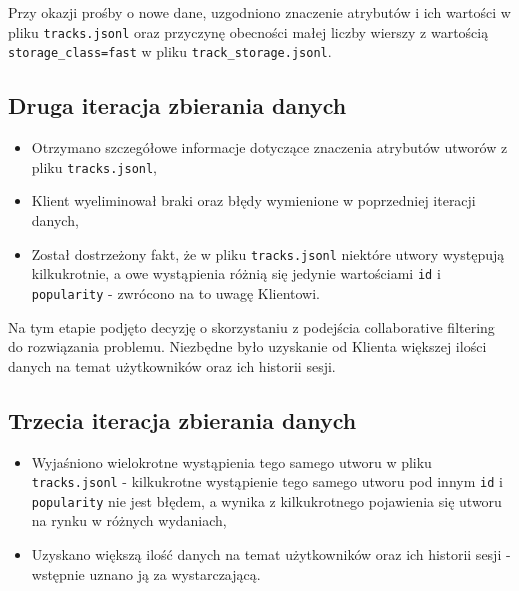 \documentclass[10pt,a4paper]{article}
\begin{document}
Przy okazji prośby o nowe dane, uzgodniono znaczenie atrybutów i ich wartości w pliku \texttt{tracks.jsonl} oraz przyczynę obecności małej liczby wierszy z wartością \texttt{storage\_class=fast} w pliku \texttt{track\_storage.jsonl}.

\subsection{Druga iteracja zbierania danych}
\begin{itemize}
\item Otrzymano szczegółowe informacje dotyczące znaczenia atrybutów utworów z pliku \texttt{tracks.jsonl},
\item Klient wyeliminował braki oraz błędy wymienione w poprzedniej iteracji danych,
\item Został dostrzeżony fakt, że w pliku \texttt{tracks.jsonl} niektóre utwory występują kilkukrotnie, a owe wystąpienia różnią się jedynie wartościami \texttt{id} i \texttt{popularity} - zwrócono na to uwagę Klientowi.

\end{itemize}

Na tym etapie podjęto decyzję o skorzystaniu z podejścia collaborative filtering do rozwiązania problemu. Niezbędne było uzyskanie od Klienta większej ilości danych na temat użytkowników oraz ich historii sesji.

\subsection{Trzecia iteracja zbierania danych}
\begin{itemize}
\item Wyjaśniono wielokrotne wystąpienia tego samego utworu w pliku \texttt{tracks.jsonl} - kilkukrotne wystąpienie tego samego utworu pod innym \texttt{id} i \texttt{popularity} nie jest błędem, a wynika z kilkukrotnego pojawienia się utworu na rynku w różnych wydaniach,
\item Uzyskano większą ilość danych na temat użytkowników oraz ich historii sesji - wstępnie uznano ją za wystarczającą.
\end{itemize}
\end{document}
